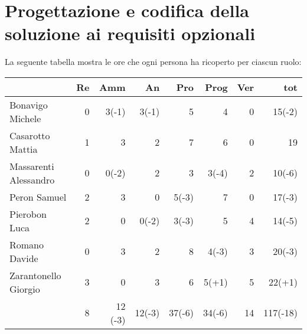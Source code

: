 \section{Progettazione e codifica della soluzione ai requisiti opzionali}

La seguente tabella mostra le ore che ogni persona ha ricoperto per ciascun ruolo:
\begin{table}[ht]
    \begin{tabularx}{\linewidth}{X|rrrrrrr}
    \rowcolor{gray!30}& Re & Amm & An & Pro & Prog & Ver & tot \\
    \hline
    Bonavigo Michele                        & 0        & 3(-1)      & 3(-1)        & 5          & 4      & 0        & 15(-2)  \\

    \rowcolor{gray!10}Casarotto Mattia      & 1        & 3          & 2            & 7          & 6      & 0        & 19 \\

    Massarenti Alessandro                   & 0        & 0(-2)      & 2            & 3          & 3(-4)  & 2        & 10(-6) \\ 

    \rowcolor{gray!10}Peron Samuel          & 2        & 3          & 0            & 5(-3)      & 7      & 0        & 17(-3)  \\ 

    Pierobon Luca                           & 2        & 0          & 0(-2)        & 3(-3)      & 5      & 4        & 14(-5) \\ 

    \rowcolor{gray!10}Romano Davide         & 0        & 3          & 2            & 8          & 4(-3)  & 3        & 20(-3)\\

    Zarantonello Giorgio                    & 3        & 0          & 3            & 6          & 5(+1)  & 5        & 22(+1)\\

    \hline                                  & 8       & 12 (-3)    & 12(-3)       & 37(-6)      & 34(-6) & 14       & 117(-18)\\  
    \end{tabularx}
\end{table}

